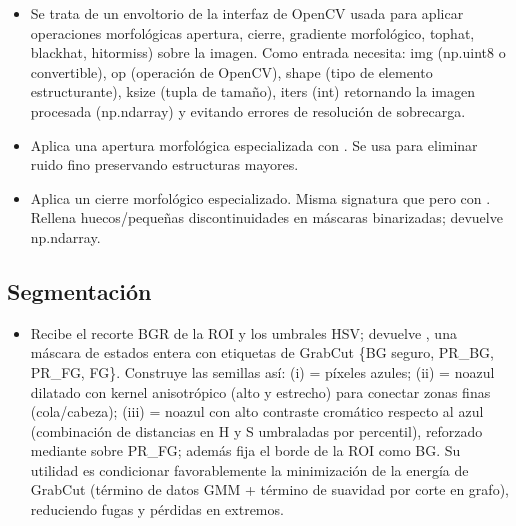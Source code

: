 \documentclass[a4paper,10pt,spanish]{jupyterBook}
\begin{document}
\begin{itemize}
\item {}
\sphinxAtStartPar
{} Se trata de un envoltorio de la interfaz de OpenCV  usada para aplicar operaciones morfológicas apertura, cierre, gradiente morfológico, tophat, blackhat, hit\sphinxhyphen{}or\sphinxhyphen{}miss) sobre la imagen. Como entrada necesita: img (np.uint8 o convertible), op (operación de OpenCV), shape (tipo de elemento estructurante), ksize (tupla de tamaño), iters (int) retornando la imagen procesada (np.ndarray) y evitando errores de resolución de sobrecarga.

\item {}
\sphinxAtStartPar
{} Aplica una apertura morfológica especializada con . Se usa para eliminar ruido fino preservando estructuras mayores.

\item {}
\sphinxAtStartPar
{} Aplica un cierre morfológico especializado. Misma signatura que  pero con . Rellena huecos/pequeñas discontinuidades en máscaras binarizadas; devuelve np.ndarray.

\end{itemize}


\subsection{Segmentación}
\label{\detokenize{content/01/Modulo-3:segmentacion}}\begin{itemize}
\item {}
\sphinxAtStartPar
{} Recibe el recorte BGR de la ROI y los umbrales HSV; devuelve , una máscara de estados entera con etiquetas de GrabCut \{BG seguro, PR\_BG, PR\_FG, FG\}. Construye las semillas así: (i)  = píxeles azules; (ii)  = no\sphinxhyphen{}azul dilatado con kernel anisotrópico (alto y estrecho) para conectar zonas finas (cola/cabeza); (iii)  = no\sphinxhyphen{}azul con alto contraste cromático respecto al azul (combinación de distancias en H y S umbraladas por percentil), reforzado mediante  sobre PR\_FG; además fija el borde de la ROI como BG. Su utilidad es condicionar favorablemente la minimización de la energía de GrabCut (término de datos GMM + término de suavidad por corte en grafo), reduciendo fugas y pérdidas en extremos.

\end{itemize}
\end{document}
